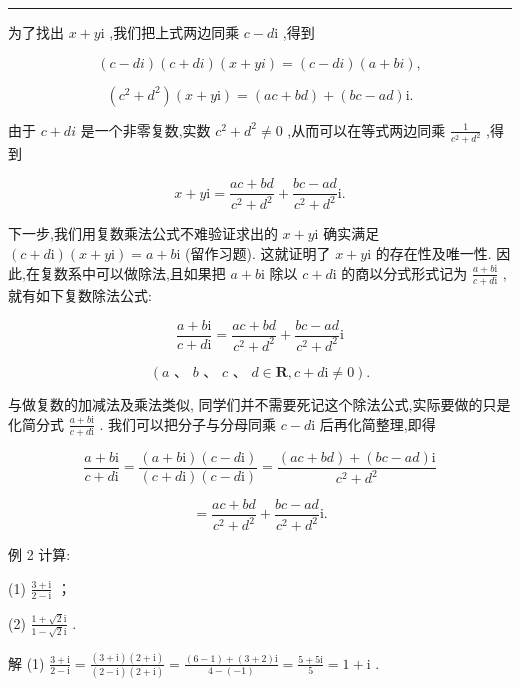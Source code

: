 \documentclass[10pt]{article}
\newcommand{\HRule}{\begin{center}\rule{0.9\linewidth}{0.2mm}\end{center}}
\begin{document}
\HRule

为了找出 \(x + y\mathrm{i}\) ,我们把上式两边同乘 \(c - d\mathrm{i}\) ,得到

\[
\left( {c - {di}}\right) \left( {c + {di}}\right) \left( {x + {yi}}\right)  = \left( {c - {di}}\right) \left( {a + {bi}}\right) ,
\]

\[
\left( {{c}^{2} + {d}^{2}}\right) \left( {x + y\mathrm{i}}\right)  = \left( {{ac} + {bd}}\right)  + \left( {{bc} - {ad}}\right) \mathrm{i}.
\]

由于 \(c + {di}\) 是一个非零复数,实数 \({c}^{2} + {d}^{2} \neq  0\) ,从而可以在等式两边同乘 \(\frac{1}{{c}^{2} + {d}^{2}}\) ,得到

\[
x + y\mathrm{i} = \frac{{ac} + {bd}}{{c}^{2} + {d}^{2}} + \frac{{bc} - {ad}}{{c}^{2} + {d}^{2}}\mathrm{i}.
\]

下一步,我们用复数乘法公式不难验证求出的 \(x + y\mathrm{i}\) 确实满足 \(\left( {c + d\mathrm{i}}\right) \left( {x + y\mathrm{i}}\right)  = a + b\mathrm{i}\) (留作习题). 这就证明了 \(x + y\mathrm{i}\) 的存在性及唯一性. 因此,在复数系中可以做除法,且如果把 \(a + b\mathrm{i}\) 除以 \(c + d\mathrm{i}\) 的商以分式形式记为 \(\frac{a + b\mathrm{i}}{c + d\mathrm{i}}\) ,就有如下复数除法公式:

\[
\frac{a + b\mathrm{i}}{c + d\mathrm{i}} = \frac{{ac} + {bd}}{{c}^{2} + {d}^{2}} + \frac{{bc} - {ad}}{{c}^{2} + {d}^{2}}\mathrm{i}
\]

\[
\left( {a\text{ 、 }b\text{ 、 }c\text{ 、 }d \in  \mathbf{R},c + d\mathrm{i} \neq  0}\right) .
\]

与做复数的加减法及乘法类似, 同学们并不需要死记这个除法公式,实际要做的只是化简分式 \(\frac{a + b\mathrm{i}}{c + d\mathrm{i}}\) . 我们可以把分子与分母同乘 \(c - d\mathrm{i}\) 后再化简整理,即得

\[
\frac{a + b\mathrm{i}}{c + d\mathrm{i}} = \frac{\left( {a + b\mathrm{i}}\right) \left( {c - d\mathrm{i}}\right) }{\left( {c + d\mathrm{i}}\right) \left( {c - d\mathrm{i}}\right) } = \frac{\left( {{ac} + {bd}}\right)  + \left( {{bc} - {ad}}\right) \mathrm{i}}{{c}^{2} + {d}^{2}}
\]

\[
= \frac{{ac} + {bd}}{{c}^{2} + {d}^{2}} + \frac{{bc} - {ad}}{{c}^{2} + {d}^{2}}\mathrm{i}.
\]

例 2 计算:

(1) \(\frac{3 + \mathrm{i}}{2 - \mathrm{i}}\) ；

(2) \(\frac{1 + \sqrt{2}\mathrm{i}}{1 - \sqrt{2}\mathrm{i}}\) .

解 (1) \(\frac{3 + \mathrm{i}}{2 - \mathrm{i}} = \frac{\left( {3 + \mathrm{i}}\right) \left( {2 + \mathrm{i}}\right) }{\left( {2 - \mathrm{i}}\right) \left( {2 + \mathrm{i}}\right) } = \frac{\left( {6 - 1}\right)  + \left( {3 + 2}\right) \mathrm{i}}{4 - \left( {-1}\right) } = \frac{5 + 5\mathrm{i}}{5} = 1 + \mathrm{i}\) .
\end{document}
